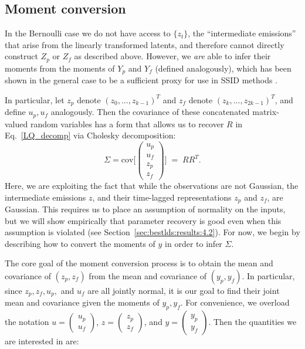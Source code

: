 \subsection{Moment conversion}
\label{sec:bestlds:theory:moment}

In the Bernoulli case we do not have access to $\{z_t\}$, the ``intermediate emissions'' that arise from the linearly transformed latents,   and therefore cannot directly construct $Z_p$ or $Z_f$ as described above. However, we \textit{are} able to infer their moments from the moments of $Y_p$ and $Y_f$ (defined analogously), which has been shown in the general case to be a sufficient proxy for use in SSID methods \cite{buesing_spectral_2012}. 


In particular, let $z_p$ denote $(z_0, ..., z_{k - 1})^T$ and $z_f$ denote $(z_k, ..., z_{2k - 1})^T$, and define $u_p, u_f$ analogously. 
Then the covariance of these concatenated matrix-valued random variables has a form that allows us to recover $R$ in Eq.~\ref{LQ_decomp} via Cholesky decomposition: 
\begin{equation}
    \label{cholesky}
    \Sigma = \mathrm{cov}\Bigg[\begin{pmatrix}
        u_p\\
        u_f\\
        z_p\\
        z_f
    \end{pmatrix}\Bigg]   
    \; = \;  RR^T.
\end{equation}
Here, we are exploiting the fact that while the observations are not Gaussian, the intermediate emissions $z$, and their time-lagged representations $z_p$ and $z_f$, are Gaussian. This requires us to place an assumption of normality on the inputs, but we will show empirically that parameter recovery is good even when this assumption is violated (see Section~\ref{sec:bestlds:results:4.2}). For now, we begin by describing how to convert the moments of $y$ in order to infer $\Sigma$.


The core goal of the moment conversion process is to obtain the mean and covariance of $(z_p, z_f)$ from the mean and covariance of $(y_p, y_f)$. In particular, since $z_p, z_f, u_p,$ and $u_f$ are all jointly normal, it is our goal to find their joint mean and covariance given the moments of $y_p, y_f$. For convenience, we overload the notation $u = \begin{pmatrix}
    u_p \\
    u_f
\end{pmatrix}$, $z = \begin{pmatrix}
    z_p \\
    z_f
\end{pmatrix}$, and $y = \begin{pmatrix}
    y_p \\
    y_f\end{pmatrix}$. Then the quantities we are interested in are:

